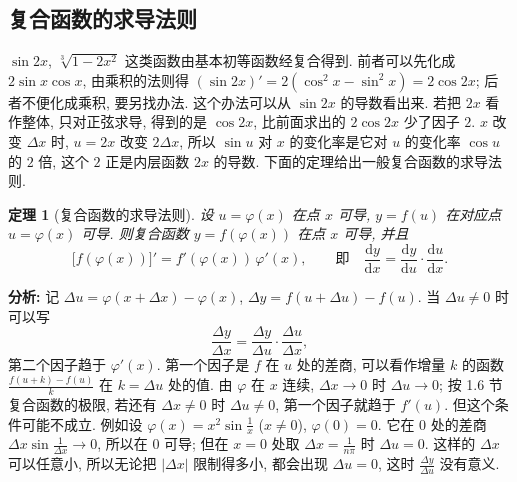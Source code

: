 \documentclass[UTF8,openany]{ctexbook}
\theoremstyle{chinesetextbook}
\newtheorem{theorem}{定理}[section]
\newcommand{\dd}{\mathrm d}
\begin{document}
\subsection{复合函数的求导法则}
$\sin2x$, $\sqrt[3]{1-2x^2}$ 这类函数由基本初等函数经复合得到. 前者可以先化成 $2\sin x\cos x$, 由乘积的法则得 $(\sin2x)'=2(\cos^2x-\sin^2x)=2\cos2x$; 后者不便化成乘积, 要另找办法. 这个办法可以从 $\sin2x$ 的导数看出来. 若把 $2x$ 看作整体, 只对正弦求导, 得到的是 $\cos2x$, 比前面求出的 $2\cos2x$ 少了因子 $2$. $x$ 改变 $\Delta x$ 时, $u=2x$ 改变 $2\Delta x$, 所以 $\sin u$ 对 $x$ 的变化率是它对 $u$ 的变化率 $\cos u$ 的 $2$ 倍, 这个 $2$ 正是内层函数 $2x$ 的导数. 下面的定理给出一般复合函数的求导法则.
\begin{theorem}[复合函数的求导法则]\label{thm:c2-2-chain}
设 $u=\varphi(x)$ 在点 $x$ 可导, $y=f(u)$ 在对应点 $u=\varphi(x)$ 可导. 则复合函数 $y=f(\varphi(x))$ 在点 $x$ 可导, 并且
\[
\bigl[f(\varphi(x))\bigr]'=f'(\varphi(x))\,\varphi'(x),\qquad\text{即}\quad\frac{\dd y}{\dd x}=\frac{\dd y}{\dd u}\cdot\frac{\dd u}{\dd x}.
\]
\end{theorem}
\par\indent\textbf{分析:} 记 $\Delta u=\varphi(x+\Delta x)-\varphi(x)$, $\Delta y=f(u+\Delta u)-f(u)$. 当 $\Delta u\ne0$ 时可以写
\[
\frac{\Delta y}{\Delta x}=\frac{\Delta y}{\Delta u}\cdot\frac{\Delta u}{\Delta x},
\]
第二个因子趋于 $\varphi'(x)$. 第一个因子是 $f$ 在 $u$ 处的差商, 可以看作增量 $k$ 的函数 $\displaystyle\frac{f(u+k)-f(u)}k$ 在 $k=\Delta u$ 处的值. 由 $\varphi$ 在 $x$ 连续, $\Delta x\to0$ 时 $\Delta u\to0$; 按 1.6 节复合函数的极限, 若还有 $\Delta x\ne0$ 时 $\Delta u\ne0$, 第一个因子就趋于 $f'(u)$. 但这个条件可能不成立. 例如设 $\displaystyle\varphi(x)=x^2\sin\frac1x$ ($x\ne0$), $\varphi(0)=0$. 它在 $0$ 处的差商 $\displaystyle\Delta x\sin\frac1{\Delta x}\to0$, 所以在 $0$ 可导; 但在 $x=0$ 处取 $\displaystyle\Delta x=\frac1{n\pi}$ 时 $\Delta u=0$. 这样的 $\Delta x$ 可以任意小, 所以无论把 $|\Delta x|$ 限制得多小, 都会出现 $\Delta u=0$, 这时 $\displaystyle\frac{\Delta y}{\Delta u}$ 没有意义.
\end{document}
